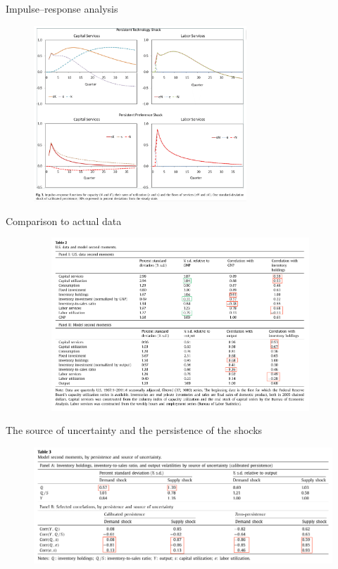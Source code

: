 \documentclass[fontset=windows,12pt,t,aspectratio=169]{beamer}
\begin{document}
\begin{frame}{Impulse–response analysis}
    \begin{figure}
         \begin{center}
         \includegraphics[width = 8cm]{table/fig3.png}
         \end{center}
    \end{figure}
\end{frame}

\begin{frame}{Comparison to actual data}
	\begin{figure}
		\includegraphics[width=11cm,height=6.5cm]{table/tab2.png}
	\end{figure}
\end{frame}

\begin{frame}{The source of uncertainty and the persistence of the shocks}
	\begin{figure}
		\includegraphics[width=13cm]{table/tab3.png}
	\end{figure}
\end{frame}
\end{document}
